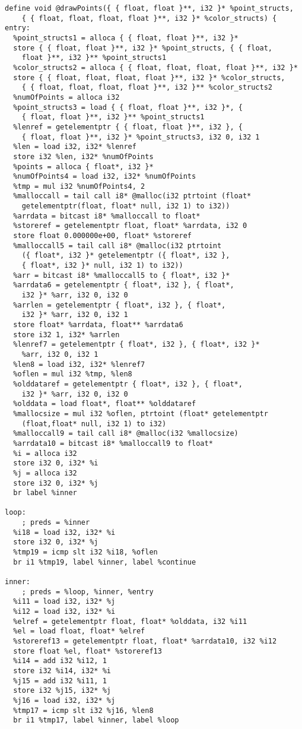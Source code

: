 \documentclass[main.tex]{subfiles}
\begin{document}
{\begin{lstlisting}
define void @drawPoints({ { float, float }**, i32 }* %point_structs,
    { { float, float, float, float }**, i32 }* %color_structs) {
entry:
  %point_structs1 = alloca { { float, float }**, i32 }*
  store { { float, float }**, i32 }* %point_structs, { { float, 
    float }**, i32 }** %point_structs1
  %color_structs2 = alloca { { float, float, float, float }**, i32 }*
  store { { float, float, float, float }**, i32 }* %color_structs, 
    { { float, float, float, float }**, i32 }** %color_structs2
  %numOfPoints = alloca i32
  %point_structs3 = load { { float, float }**, i32 }*, {
    { float, float }**, i32 }** %point_structs1
  %lenref = getelementptr { { float, float }**, i32 }, {
    { float, float }**, i32 }* %point_structs3, i32 0, i32 1
  %len = load i32, i32* %lenref
  store i32 %len, i32* %numOfPoints
  %points = alloca { float*, i32 }*
  %numOfPoints4 = load i32, i32* %numOfPoints
  %tmp = mul i32 %numOfPoints4, 2
  %malloccall = tail call i8* @malloc(i32 ptrtoint (float*
    getelementptr(float, float* null, i32 1) to i32))
  %arrdata = bitcast i8* %malloccall to float*
  %storeref = getelementptr float, float* %arrdata, i32 0
  store float 0.000000e+00, float* %storeref
  %malloccall5 = tail call i8* @malloc(i32 ptrtoint
    ({ float*, i32 }* getelementptr ({ float*, i32 }, 
    { float*, i32 }* null, i32 1) to i32))
  %arr = bitcast i8* %malloccall5 to { float*, i32 }*
  %arrdata6 = getelementptr { float*, i32 }, { float*,
    i32 }* %arr, i32 0, i32 0
  %arrlen = getelementptr { float*, i32 }, { float*,
    i32 }* %arr, i32 0, i32 1
  store float* %arrdata, float** %arrdata6
  store i32 1, i32* %arrlen
  %lenref7 = getelementptr { float*, i32 }, { float*, i32 }*
    %arr, i32 0, i32 1
  %len8 = load i32, i32* %lenref7
  %oflen = mul i32 %tmp, %len8
  %olddataref = getelementptr { float*, i32 }, { float*,
    i32 }* %arr, i32 0, i32 0
  %olddata = load float*, float** %olddataref
  %mallocsize = mul i32 %oflen, ptrtoint (float* getelementptr
    (float,float* null, i32 1) to i32)
  %malloccall9 = tail call i8* @malloc(i32 %mallocsize)
  %arrdata10 = bitcast i8* %malloccall9 to float*
  %i = alloca i32
  store i32 0, i32* %i
  %j = alloca i32
  store i32 0, i32* %j
  br label %inner

loop:                                             
    ; preds = %inner
  %i18 = load i32, i32* %i
  store i32 0, i32* %j
  %tmp19 = icmp slt i32 %i18, %oflen
  br i1 %tmp19, label %inner, label %continue

inner:                                            
    ; preds = %loop, %inner, %entry
  %i11 = load i32, i32* %j
  %i12 = load i32, i32* %i
  %elref = getelementptr float, float* %olddata, i32 %i11
  %el = load float, float* %elref
  %storeref13 = getelementptr float, float* %arrdata10, i32 %i12
  store float %el, float* %storeref13
  %i14 = add i32 %i12, 1
  store i32 %i14, i32* %i
  %j15 = add i32 %i11, 1
  store i32 %j15, i32* %j
  %j16 = load i32, i32* %j
  %tmp17 = icmp slt i32 %j16, %len8
  br i1 %tmp17, label %inner, label %loop


\end{lstlisting}}
\end{document}
